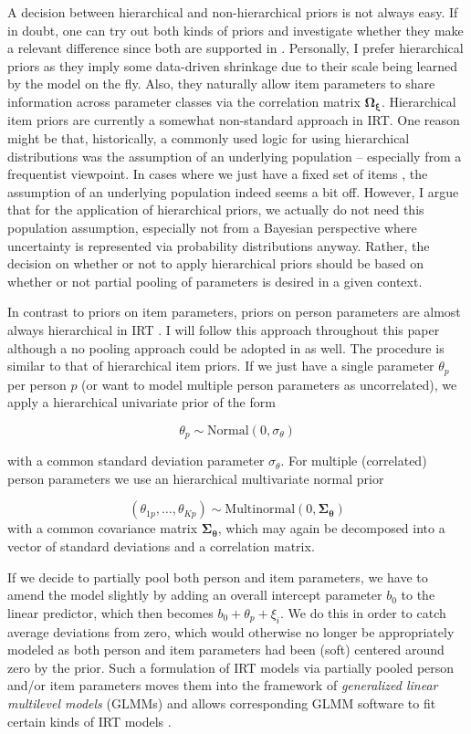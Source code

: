 \documentclass[
]{jss}
\begin{document}
A decision between hierarchical and non-hierarchical priors is not
always easy. If in doubt, one can try out both kinds of priors and
investigate whether they make a relevant difference since both are
supported in . Personally, I prefer hierarchical priors as
they imply some data-driven shrinkage due to their scale being learned
by the model on the fly. Also, they naturally allow item parameters to
share information across parameter classes via the correlation matrix
\(\mathbf{\Omega_\xi}\). Hierarchical item priors are currently a
somewhat non-standard approach in IRT. One reason might be that,
historically, a commonly used logic for using hierarchical distributions
was the assumption of an underlying population -- especially from a
frequentist viewpoint. In cases where we just have a fixed set of items
\citep[as opposed to some rule-based automatic generation of items;
e.g.,][]{gierl2012}, the assumption of an underlying population indeed
seems a bit off. However, I argue that for the application of
hierarchical priors, we actually do not need this population assumption,
especially not from a Bayesian perspective where uncertainty is
represented via probability distributions anyway. Rather, the decision
on whether or not to apply hierarchical priors should be based on
whether or not partial pooling of parameters is desired in a given
context.

In contrast to priors on item parameters, priors on person parameters
are almost always hierarchical in IRT
\citep[e.g.,][]{deboeck2011, fox2010, levy2017}. I will follow this
approach throughout this paper although a no pooling approach could be
adopted in  as well. The procedure is similar to that of
hierarchical item priors. If we just have a single parameter
\(\theta_p\) per person \(p\) (or want to model multiple person
parameters as uncorrelated), we apply a hierarchical univariate prior of
the form

\[
\theta_p \sim \text{Normal}(0, \sigma_\theta)
\]

with a common standard deviation parameter \(\sigma_\theta\). For
multiple (correlated) person parameters we use an hierarchical
multivariate normal prior

\[
(\theta_{1p}, \ldots, \theta_{Kp}) \sim \text{Multinormal}(0, \mathbf{\Sigma_\theta})
\] with a common covariance matrix \(\mathbf{\Sigma_\theta}\), which may
again be decomposed into a vector of standard deviations and a
correlation matrix.

If we decide to partially pool both person and item parameters, we have
to amend the model slightly by adding an overall intercept parameter
\(b_0\) to the linear predictor, which then becomes
\(b_0 + \theta_p + \xi_i\). We do this in order to catch average
deviations from zero, which would otherwise no longer be appropriately
modeled as both person and item parameters had been (soft) centered
around zero by the prior. Such a formulation of IRT models via partially
pooled person and/or item parameters moves them into the framework of
\emph{generalized linear multilevel models} (GLMMs) and allows
corresponding GLMM software to fit certain kinds of IRT models
\citep{deboeck2011}.
\end{document}
